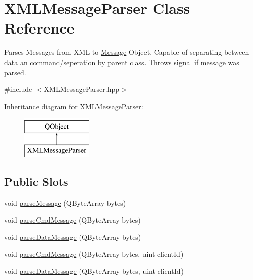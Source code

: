 \hypertarget{class_x_m_l_message_parser}{}\section{X\+M\+L\+Message\+Parser Class Reference}
\label{class_x_m_l_message_parser}


Parses Messages from X\+M\+L to \hyperlink{class_message}{Message} Object. Capable of separating between data an command/seperation by parent class. Throws signal if message was parsed.  




{\ttfamily \#include $<$X\+M\+L\+Message\+Parser.\+hpp$>$}

Inheritance diagram for X\+M\+L\+Message\+Parser\+:\begin{figure}[H]
\begin{center}
\leavevmode
\includegraphics[height=2.000000cm]{class_x_m_l_message_parser}
\end{center}
\end{figure}
\subsection*{Public Slots}
\begin{DoxyCompactItemize}
\item 
void \hyperlink{class_x_m_l_message_parser_a9fc14a7468ad502f705ffa92671c2284}{parse\+Message} (Q\+Byte\+Array bytes)
\item 
void \hyperlink{class_x_m_l_message_parser_ab01279b415a498d15fc9326abeeb692d}{parse\+Cmd\+Message} (Q\+Byte\+Array bytes)
\item 
void \hyperlink{class_x_m_l_message_parser_ad455f5408ec1d6289bcc8a4f2d5e1473}{parse\+Data\+Message} (Q\+Byte\+Array bytes)
\item 
void \hyperlink{class_x_m_l_message_parser_aff44c6ee3a1158b0d1729564a4dd183c}{parse\+Cmd\+Message} (Q\+Byte\+Array bytes, uint client\+Id)
\item 
void \hyperlink{class_x_m_l_message_parser_a03953c5b090132123596719af163e362}{parse\+Data\+Message} (Q\+Byte\+Array bytes, uint client\+Id)
\end{DoxyCompactItemize}
